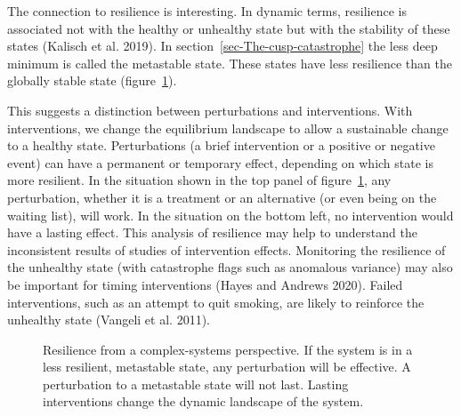 \documentclass[
  a4paper,
  DIV=11,
  numbers=noendperiod,
  oneside]{scrreprt}
\begin{document}
The connection to resilience is interesting. In dynamic terms,
resilience is associated not with the healthy or unhealthy state but
with the stability of these states (Kalisch et al. 2019). In
section~\ref{sec-The-cusp-catastrophe} the less deep minimum is called
the metastable state. These states have less resilience than the
globally stable state (figure~\ref{fig-ch6-img10-old-79}).

This suggests a distinction between perturbations and interventions.
With interventions, we change the equilibrium landscape to allow a
sustainable change to a healthy state. Perturbations (a brief
intervention or a positive or negative event) can have a permanent or
temporary effect, depending on which state is more resilient. In the
situation shown in the top panel of figure~\ref{fig-ch6-img10-old-79},
any perturbation, whether it is a treatment or an alternative (or even
being on the waiting list), will work. In the situation on the bottom
left, no intervention would have a lasting effect. This analysis of
resilience may help to understand the inconsistent results of studies of
intervention effects. Monitoring the resilience of the unhealthy state
(with catastrophe flags such as anomalous variance) may also be
important for timing interventions (Hayes and Andrews 2020). Failed
interventions, such as an attempt to quit smoking, are likely to
reinforce the unhealthy state (Vangeli et al. 2011).

\begin{figure}


\caption{\label{fig-ch6-img10-old-79}Resilience from a complex-systems
perspective. If the system is in a less resilient, metastable state, any
perturbation will be effective. A perturbation to a metastable state
will not last. Lasting interventions change the dynamic landscape of the
system.}

\end{figure}%
\end{document}
